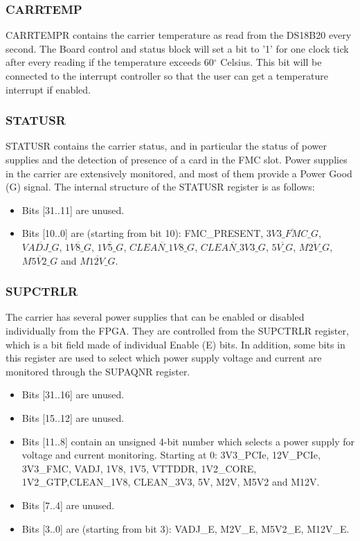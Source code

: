 \documentclass{article}
\begin{document}
\subsubsection{CARRTEMP}
CARRTEMPR contains the carrier temperature as read from the DS18B20 every second. The Board control and status block will set a bit to '1' for one clock tick after every reading if the temperature exceeds 60$^\circ$ Celsius. This bit will be connected to the interrupt controller so that the user can get a temperature interrupt if enabled. 

\subsubsection{STATUSR}
STATUSR contains the carrier status, and in particular the status of power supplies and the detection of presence of a card in the FMC slot. Power supplies in the carrier are extensively monitored, and most of them provide a Power Good (G) signal. The internal structure of the STATUSR register is as follows:
\begin{itemize}
\item Bits [31..11] are unused.
\item Bits [10..0] are (starting from bit 10): FMC\_PRESENT, $\overline{3V3\_FMC\_G}$,  $\overline{VADJ\_G}$, $\overline{1V8\_G}$,  $\overline{1V5\_G}$,  $\overline{CLEAN\_1V8\_G}$, $\overline{CLEAN\_3V3\_G}$, $\overline{5V\_G}$, \linebreak$\overline{M2V\_G}$, $\overline{M5V2\_G}$ and $\overline{M12V\_G}$.
\end{itemize}

\subsubsection{SUPCTRLR}
The carrier has several power supplies that can be enabled or disabled individually from the FPGA. They are controlled from the SUPCTRLR register, which is a bit field made of individual Enable (E) bits. In addition, some bits in this register are used to select which power supply voltage and current are monitored through the SUPAQNR register.
\begin{itemize}
\item Bits [31..16] are unused.
\item Bits [15..12] are unused.
\item Bits [11..8] contain an unsigned 4-bit number which selects a power supply for voltage and current monitoring. Starting at 0: 3V3\_PCIe, 12V\_PCIe, 3V3\_FMC, VADJ, 1V8, 1V5, VTTDDR, 1V2\_CORE, 1V2\_GTP,\linebreak CLEAN\_1V8, CLEAN\_3V3, 5V, M2V, M5V2 and M12V.
\item Bits [7..4] are unused.
\item Bits [3..0] are (starting from bit 3): VADJ\_E, M2V\_E, M5V2\_E, M12V\_E.
\end{itemize}
\end{document}
